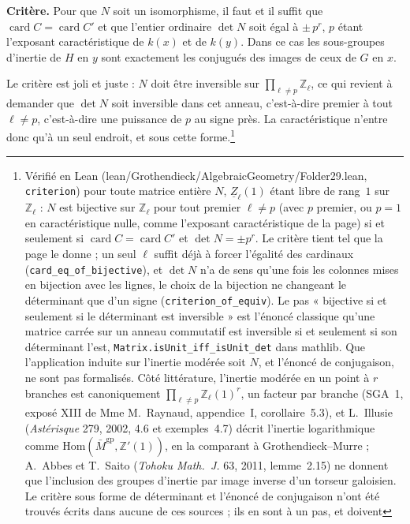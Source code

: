 \documentclass[11pt,a4paper]{article}
\begin{document}
\textbf{Critère.} Pour que $N$ soit un isomorphisme, il faut et il suffit que
$\operatorname{card} C = \operatorname{card} C'$ et que l'entier ordinaire
$\det N$ soit égal à $\pm\, p^{r}$, $p$ étant l'exposant caractéristique de
$k(x)$ et de $k(y)$. Dans ce cas les sous-groupes d'inertie de $H$ en $y$ sont
exactement les conjugués des images de ceux de $G$ en $x$.

Le critère est joli et juste : $N$ doit être inversible sur
$\prod_{\ell \neq p}\mathbb{Z}_{\ell}$, ce qui revient à demander que $\det N$
soit inversible dans cet anneau, c'est-à-dire premier à tout $\ell \neq p$,
c'est-à-dire une puissance de $p$ au signe près. La caractéristique n'entre
donc qu'à un seul endroit, et sous cette forme.\footnote{Vérifié en Lean
(lean/Grothendieck/AlgebraicGeometry/Folder29.lean, \texttt{criterion}) pour toute matrice
entière $N$, $\underline{Z}_{\ell}(1)$ étant libre de rang~$1$ sur
$\mathbb{Z}_{\ell}$ : $N$ est bijective sur $\mathbb{Z}_{\ell}$ pour tout
premier $\ell \neq p$ (avec $p$ premier, ou $p = 1$ en caractéristique nulle,
comme l'exposant caractéristique de la page) si et seulement si
$\operatorname{card} C = \operatorname{card} C'$ et $\det N = \pm p^{r}$. Le
critère tient tel que la page le donne ; un seul $\ell$ suffit déjà à forcer
l'égalité des cardinaux (\texttt{card\_eq\_of\_bijective}), et $\det N$ n'a
de sens qu'une fois les colonnes mises en bijection avec les lignes, le choix
de la bijection ne changeant le déterminant que d'un signe
(\texttt{criterion\_of\_equiv}). Le pas « bijective si et seulement si le
déterminant est inversible » est l'énoncé classique qu'une matrice carrée sur
un anneau commutatif est inversible si et seulement si son déterminant l'est,
\texttt{Matrix.isUnit\_iff\_isUnit\_det} dans mathlib. Que l'application
induite sur l'inertie modérée soit $N$, et l'énoncé de conjugaison, ne sont pas
formalisés. Côté littérature, l'inertie modérée en un point à $r$ branches est
canoniquement $\prod_{\ell \neq p} \mathbb{Z}_{\ell}(1)^{r}$, un facteur par
branche (SGA~1, exposé XIII de Mme M.~Raynaud, appendice~I, corollaire~5.3), et
L.~Illusie (\emph{Astérisque} 279, 2002, 4.6 et exemples~4.7) décrit
l'inertie logarithmique comme $\mathrm{Hom}(\bar{M}^{\mathrm{gp}},
\mathbb{Z}'(1))$, en la comparant à Grothendieck--Murre ; A.~Abbes et
T.~Saito (\emph{Tohoku Math.~J.} 63, 2011, lemme~2.15) ne donnent que
l'inclusion des groupes d'inertie par image inverse d'un torseur galoisien.
Le critère sous forme de déterminant et l'énoncé de conjugaison n'ont été
trouvés écrits dans aucune de ces sources ; ils en sont à un pas, et doivent
}
\end{document}

